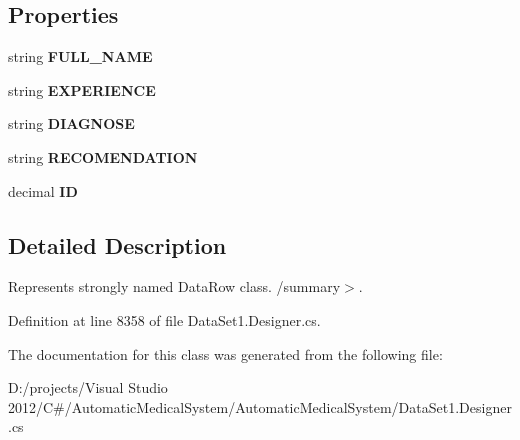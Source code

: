 \subsection*{Properties}
\begin{CompactItemize}
\item 
string \textbf{FULL\_\-NAME}\hspace{0.3cm}{\tt  [get, set]}\label{class_automatic_medical_system_1_1_data_set1_1_1_v_s_p_d_i_a_g_n_o_s_e_row_63ba3954b6de58784b4c576c3d2f7549}

\item 
string \textbf{EXPERIENCE}\hspace{0.3cm}{\tt  [get, set]}\label{class_automatic_medical_system_1_1_data_set1_1_1_v_s_p_d_i_a_g_n_o_s_e_row_352661b5f63c9afa811d1f5b7737e1fe}

\item 
string \textbf{DIAGNOSE}\hspace{0.3cm}{\tt  [get, set]}\label{class_automatic_medical_system_1_1_data_set1_1_1_v_s_p_d_i_a_g_n_o_s_e_row_4cfd3a74d0e5b6b712ff7958e3a851de}

\item 
string \textbf{RECOMENDATION}\hspace{0.3cm}{\tt  [get, set]}\label{class_automatic_medical_system_1_1_data_set1_1_1_v_s_p_d_i_a_g_n_o_s_e_row_0fd6b07a9d75bc1b7bca2c53d33c4475}

\item 
decimal \textbf{ID}\hspace{0.3cm}{\tt  [get, set]}\label{class_automatic_medical_system_1_1_data_set1_1_1_v_s_p_d_i_a_g_n_o_s_e_row_e4a3c571b3a0e7f5dca778d6a2790899}

\end{CompactItemize}


\subsection{Detailed Description}
Represents strongly named DataRow class. /summary$>$. 

Definition at line 8358 of file DataSet1.Designer.cs.

The documentation for this class was generated from the following file:\begin{CompactItemize}
\item 
D:/projects/Visual Studio 2012/C\#/AutomaticMedicalSystem/AutomaticMedicalSystem/DataSet1.Designer.cs\end{CompactItemize}
